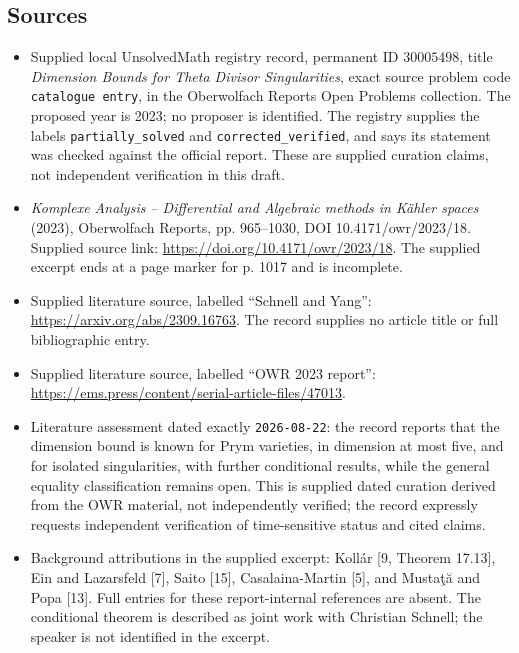 \documentclass[11pt]{article}
\begin{document}
\subsection{Sources}
\begin{itemize}
\item Supplied local UnsolvedMath registry record, permanent ID \(30005498\), title \emph{Dimension Bounds for Theta Divisor Singularities}, exact source problem code \texttt{catalogue entry}, in the Oberwolfach Reports Open Problems collection. The proposed year is 2023; no proposer is identified. The registry supplies the labels \texttt{partially\_solved} and \texttt{corrected\_verified}, and says its statement was checked against the official report. These are supplied curation claims, not independent verification in this draft.
\item \emph{Komplexe Analysis -- Differential and Algebraic methods in K\"ahler spaces} (2023), Oberwolfach Reports, pp. 965--1030, DOI 10.4171/owr/2023/18. Supplied source link: \url{https://doi.org/10.4171/owr/2023/18}. The supplied excerpt ends at a page marker for p. 1017 and is incomplete.
\item Supplied literature source, labelled ``Schnell and Yang'': \url{https://arxiv.org/abs/2309.16763}. The record supplies no article title or full bibliographic entry.
\item Supplied literature source, labelled ``OWR 2023 report'': \url{https://ems.press/content/serial-article-files/47013}.
\item Literature assessment dated exactly \texttt{2026-08-22}: the record reports that the dimension bound is known for Prym varieties, in dimension at most five, and for isolated singularities, with further conditional results, while the general equality classification remains open. This is supplied dated curation derived from the OWR material, not independently verified; the record expressly requests independent verification of time-sensitive status and cited claims.
\item Background attributions in the supplied excerpt: Koll\'ar [9, Theorem 17.13], Ein and Lazarsfeld [7], Saito [15], Casalaina-Martin [5], and Musta\c{t}\u{a} and Popa [13]. Full entries for these report-internal references are absent. The conditional theorem is described as joint work with Christian Schnell; the speaker is not identified in the excerpt.
\end{itemize}
\end{document}

